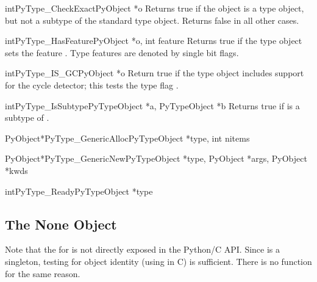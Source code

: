\begin{cfuncdesc}{int}{PyType_CheckExact}{PyObject *o}
  Returns true if the object  is a type object, but not a
  subtype of the standard type object.  Returns false in all other
  cases.
\end{cfuncdesc}

\begin{cfuncdesc}{int}{PyType_HasFeature}{PyObject *o, int feature}
  Returns true if the type object  sets the feature
  .  Type features are denoted by single bit flags.
\end{cfuncdesc}

\begin{cfuncdesc}{int}{PyType_IS_GC}{PyObject *o}
  Return true if the type object includes support for the cycle
  detector; this tests the type flag .
\end{cfuncdesc}

\begin{cfuncdesc}{int}{PyType_IsSubtype}{PyTypeObject *a, PyTypeObject *b}
  Returns true if  is a subtype of .
\end{cfuncdesc}

\begin{cfuncdesc}{PyObject*}{PyType_GenericAlloc}{PyTypeObject *type,
                                                  int nitems}
\end{cfuncdesc}

\begin{cfuncdesc}{PyObject*}{PyType_GenericNew}{PyTypeObject *type,
                                            PyObject *args, PyObject *kwds}
\end{cfuncdesc}

\begin{cfuncdesc}{int}{PyType_Ready}{PyTypeObject *type}
\end{cfuncdesc}


\subsection{The None Object \label{noneObject}}

Note that the  for  is not directly
exposed in the Python/C API.  Since  is a singleton,
testing for object identity (using \samp{==} in C) is sufficient.
There is no  function for the same reason.

